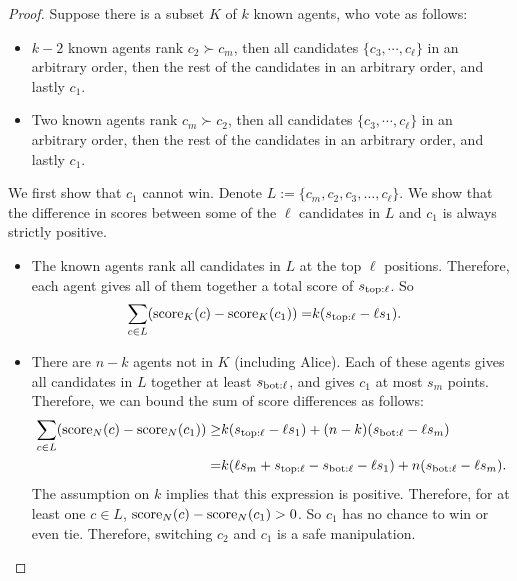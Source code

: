 \begin{proof}
Suppose there is a subset $K$ of $k$ known agents, who vote as follows:
\begin{itemize}
\item $k-2$ known agents rank $c_2 \succ c_m$, then all candidates $\{c_3, \cdots , c_{\ell}\}$ in an arbitrary order, then the rest of the candidates in an arbitrary order, and lastly $c_1$.
\item Two known agents rank $c_m \succ c_2$, then all candidates $\{c_3 , \cdots , c_{\ell}\}$ in an arbitrary order, then the rest of the candidates in an arbitrary order, and lastly $c_1$.
\end{itemize}
We first show that $c_1$ cannot win. 
Denote $L := \{c_m, c_2, c_3, \ldots, c_{\ell}\}$.
We show that the difference in scores between some of the $\ell$ candidates in $L$ and $c_1$ is always strictly positive.
\begin{itemize}
\item The known agents rank all candidates in $L$ at the top $\ell$ positions. Therefore, each agent gives all of them together a total score of $s_{\mathrm{top:}\ell}$. So
\begin{align*}
\sum_{c\in L} (\operatorname{score}_K(c)-\operatorname{score}_K(c_1)) =
&
k(s_{\mathrm{top:}\ell} - \ell s_1).
\end{align*}
\item There are $n-k$ agents not in $K$ (including Alice). 
Each of these agents gives all candidates in $L$ together at least $s_{\mathrm{bot:}\ell}$, and gives $c_1$ at most $s_m$ points. Therefore, we can bound the sum of score differences as follows:
\begin{align*}
\sum_{c\in L} (\operatorname{score}_N(c)-\operatorname{score}_N(c_1)) \geq
&
k (s_{\mathrm{top:}\ell} - \ell s_1)
+ (n-k) (s_{\mathrm{bot:}\ell} - \ell s_m)
\\
=&
k (\ell s_m + s_{\mathrm{top:}\ell} - s_{\mathrm{bot:}\ell} - \ell s_1)
+ n(s_{\mathrm{bot:}\ell} - \ell s_m).
\end{align*}
The assumption on $k$ implies that this expression is positive. Therefore, for at least one $c\in L$, $\operatorname{score}_N(c)-\operatorname{score}_N(c_1) > 0$.
So $c_1$ has no chance to win or even tie.
Therefore, switching $c_2$ and $c_1$ is a safe manipulation.
\end{itemize}



\end{proof}
